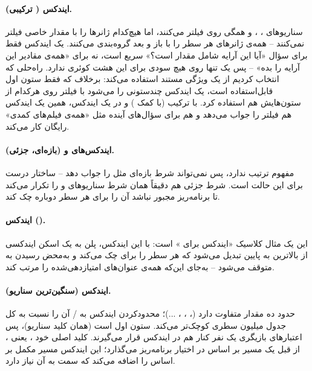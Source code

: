 \paragraph{ایندکس  ( ترکیبی).} سناریوهای ، ،  و  همگی روی  فیلتر می‌کنند، اما هیچ‌کدام ژانرها را با مقدار خاصی فیلتر نمی‌کنند -- همه‌ی ژانرهای هر سطر را با  باز و بعد گروه‌بندی می‌کنند. یک ایندکس  فقط برای سؤال «آیا این آرایه شامل مقدار  است؟» سریع است، نه برای «همه‌ی مقادیر این آرایه را بده» -- پس یک  تنها روی  هیچ سودی برای این هشت کوئری ندارد. راه‌حلی که انتخاب کردیم از یک ویژگی مستند  \cite{pggin} استفاده می‌کند: برخلاف  که فقط ستون اول قابل‌استفاده است، یک ایندکس  چندستونی را می‌شود با فیلتر روی هرکدام از ستون‌هایش هم استفاده کرد. با ترکیب  (با کمک ) و  در یک ایندکس، همین یک ایندکس هم فیلتر  را جواب می‌دهد و هم برای سؤال‌های آینده مثل «همه‌ی فیلم‌های کمدی» رایگان کار می‌کند.

\paragraph{ایندکس‌های  و  (بازه‌ای، جزئی).}  مفهوم ترتیب ندارد، پس نمی‌تواند شرط بازه‌ای مثل  را جواب دهد --  ساختار درست برای این حالت است. شرط  جزئی هم دقیقاً همان شرط  سناریوهای  و  را تکرار می‌کند تا برنامه‌ریز مجبور نباشد آن را برای هر سطر دوباره چک کند.

\paragraph{ایندکس  ().} این یک مثال کلاسیک «ایندکس برای » است: با این ایندکس، پلن به یک اسکن ایندکسی از بالاترین  به پایین تبدیل می‌شود که هر سطر را برای  چک می‌کند و به‌محض رسیدن به  متوقف می‌شود -- به‌جای این‌که همه‌ی عنوان‌های امتیازدهی‌شده را مرتب کند.

\paragraph{ایندکس  (سنگین‌ترین سناریو).}  حدود ده مقدار متفاوت دارد (، ، ، ...)؛ محدودکردن ایندکس به / آن را نسبت به کل جدول  میلیون سطری کوچک‌تر می‌کند. ستون اول  است (همان کلید  سناریو)، پس اعتبارهای بازیگری یک نفر کنار هم در ایندکس قرار می‌گیرند. کلید اصلی خود ، یعنی ، از قبل یک مسیر بر اساس  در اختیار برنامه‌ریز می‌گذارد؛ این ایندکس مسیر مکمل بر اساس  را اضافه می‌کند که سمت  به آن نیاز دارد.

